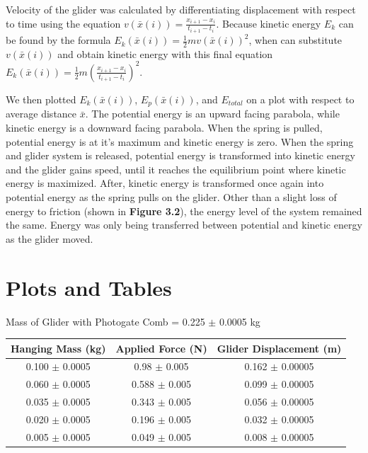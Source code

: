 \documentclass[11pt]{report}
\begin{document}
Velocity of the glider was calculated by differentiating displacement with respect to
time using the equation \(v(\bar{x}(i)) = \frac{x_{i+1} - x_i}{t_{i+1} - t_i}\).
Because kinetic energy \(E_k\) can be found by the formula \(E_k(\bar{x}(i)) =
\frac{1}{2}mv(\bar{x}(i))^2\), when can substitute \(v(\bar{x}(i))\) and obtain
kinetic energy with this final equation \(E_k(\bar{x}(i)) =
\frac{1}{2}m(\frac{x_{i+1} - x_i}{t_{i+1} - t_i})^2\). 

We then plotted \(E_k(\bar{x}(i))\), \(E_p(\bar{x}(i))\), and \(E_{total}\) on a
plot with respect to average distance $\bar{x}$.  The potential energy is an
upward facing parabola, while kinetic energy is a downward facing parabola.
When the spring is pulled, potential energy is at it's maximum and kinetic
energy is zero.  When the spring and glider system is released, potential energy
is transformed into kinetic energy and the glider gains speed, until it reaches
the equilibrium point where kinetic energy is maximized.  After, kinetic energy
is transformed once again into potential energy as the spring pulls on the
glider.  Other than a slight loss of energy to friction (shown in \textbf{Figure
3.2}), the energy level of the system remained the same.  Energy was only being
transferred between potential and kinetic energy as the glider moved.

\section*{Plots and Tables}
Mass of Glider with Photogate Comb = 0.225 $\pm$ 0.0005 kg

\begin{center}
    \begin{tabular}{| c | c | c |}
        \hline
        Hanging Mass (kg) & Applied Force (N) & Glider Displacement (m) \\
        \hline
        0.100 $\pm$ 0.0005  & 0.98 $\pm$ 0.005 & 0.162 $\pm$ 0.00005 \\
        \hline
        0.060 $\pm$ 0.0005 & 0.588 $\pm$ 0.005 & 0.099 $\pm$ 0.00005 \\
        \hline
        0.035 $\pm$ 0.0005 & 0.343 $\pm$ 0.005 & 0.056 $\pm$ 0.00005 \\
        \hline
        0.020 $\pm$ 0.0005 & 0.196 $\pm$ 0.005 & 0.032 $\pm$ 0.00005 \\
        \hline
        0.005 $\pm$ 0.0005 & 0.049 $\pm$ 0.005 & 0.008 $\pm$ 0.00005 \\
        \hline
    \end{tabular}
\end{center}
\end{document}
